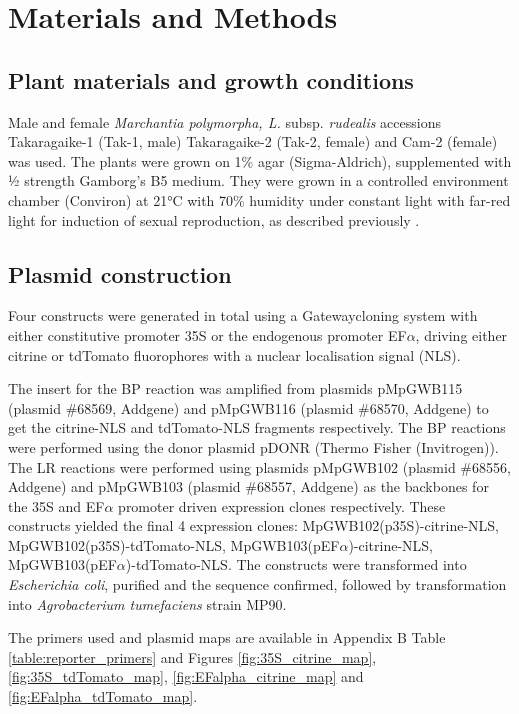 \clearpage

\section{Materials and Methods}

\subsection{Plant materials and growth conditions}

Male and female \textit{Marchantia polymorpha, L.} subsp. \textit{rudealis} accessions Takaragaike-1 (Tak-1, male) Takaragaike-2 (Tak-2, female) and Cam-2 (female) was used. The plants were grown on 1\% agar (Sigma-Aldrich), supplemented with ½ strength Gamborg's B5 medium. They were grown in a controlled environment chamber (Conviron) at 21°C with 70\% humidity under constant light with far-red light for induction of sexual reproduction, as described previously \citep{RN212,RN254}.

\subsection{Plasmid construction}

Four constructs were generated in total  using a Gateway\textregistered cloning system with either constitutive promoter 35S or the endogenous promoter EF$\alpha$, driving either citrine or tdTomato fluorophores with a nuclear localisation signal (NLS).

The insert for the BP reaction was amplified from plasmids pMpGWB115 (plasmid \#68569, Addgene) and pMpGWB116 (plasmid \#68570, Addgene) \citep{RN72} to get the citrine-NLS and tdTomato-NLS fragments respectively. The BP reactions were performed using the donor plasmid pDONR (Thermo Fisher (Invitrogen)). The LR reactions were performed using plasmids pMpGWB102 (plasmid \#68556, Addgene) and pMpGWB103 (plasmid \#68557, Addgene)\citep{RN72} as the backbones for the 35S and EF$\alpha$ promoter driven expression clones respectively. These constructs yielded the final 4 expression clones: MpGWB102(p35S)-citrine-NLS, MpGWB102(p35S)-tdTomato-NLS, MpGWB103(pEF$\alpha$)-citrine-NLS, MpGWB103(pEF$\alpha$)-tdTomato-NLS. The constructs were transformed into \textit{Escherichia  coli}, purified and the sequence confirmed, followed by transformation into \textit{Agrobacterium tumefaciens} strain MP90.

The primers used and plasmid maps are available in Appendix B Table \ref{table:reporter_primers} and Figures \ref{fig:35S_citrine_map}, \ref{fig:35S_tdTomato_map}, \ref{fig:EFalpha_citrine_map} and \ref{fig:EFalpha_tdTomato_map}.

